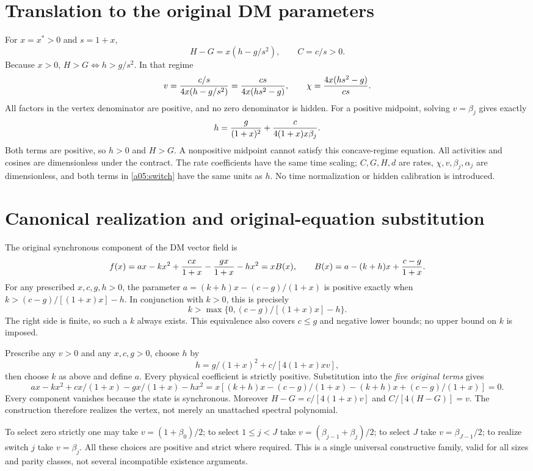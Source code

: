 \documentclass[11pt]{article}
\begin{document}
\section{Translation to the original DM parameters}
For $x=x^*>0$ and $s=1+x$,
\[
 H-G=x(h-g/s^2),\qquad C=c/s>0.
\]
Because $x>0$, $H>G\iff h>g/s^2$. In that regime
\[
 v={c/s\over4x(h-g/s^2)}={cs\over4x(hs^2-g)},\qquad
 \chi={4x(hs^2-g)\over cs}.
\]
All factors in the vertex denominator are positive, and no zero
denominator is hidden. For a positive midpoint, solving $v=\beta_j$
gives exactly
\begin{equation}
 h={g\over(1+x)^2}+{c\over4(1+x)x\beta_j}. \label{a05:switch}
\end{equation}
Both terms are positive, so $h>0$ and $H>G$. A nonpositive midpoint
cannot satisfy this concave-regime equation. All activities and cosines
are dimensionless under the contract. The rate coefficients have the
same time scaling; $C,G,H,d$ are rates, $\chi,v,\beta_j,\alpha_j$
are dimensionless, and both terms in \eqref{a05:switch} have the same
units as $h$. No time normalization or hidden calibration is introduced.

\section{Canonical realization and original-equation substitution}
The original synchronous component of the DM vector field is
\[
 f(x)=ax-kx^2+{cx\over1+x}-{gx\over1+x}-hx^2
 =xB(x),\qquad B(x)=a-(k+h)x+{c-g\over1+x}.
\]
For any prescribed $x,c,g,h>0$, the parameter
$a=(k+h)x-(c-g)/(1+x)$ is positive exactly when
$k>(c-g)/[(1+x)x]-h$. In conjunction with $k>0$, this is precisely
\[
 k>\max\{0,(c-g)/[(1+x)x]-h\}.
\]
The right side is finite, so such a $k$ always exists. This equivalence
also covers $c\le g$ and negative lower bounds; no upper bound on $k$
is imposed.

Prescribe any $v>0$ and any $x,c,g>0$, choose $h$ by
\[
 h=g/(1+x)^2+c/[4(1+x)xv],
\]
then choose $k$ as above and define $a$. Every physical coefficient is
strictly positive. Substitution into the \emph{five original terms}
gives
\[
 ax-kx^2+cx/(1+x)-gx/(1+x)-hx^2
 =x[(k+h)x-(c-g)/(1+x)-(k+h)x+(c-g)/(1+x)]=0.
\]
Every component vanishes because the state is synchronous. Moreover
$H-G=c/[4(1+x)v]$ and $C/[4(H-G)]=v$. The construction therefore
realizes the vertex, not merely an unattached spectral polynomial.

To select zero strictly one may take $v=(1+\beta_0)/2$; to select
$1\le j<J$ take $v=(\beta_{j-1}+\beta_j)/2$; to select $J$ take
$v=\beta_{J-1}/2$; to realize switch $j$ take $v=\beta_j$.
All these choices are positive and strict where required. This is a
single universal constructive family, valid for all sizes and parity
classes, not several incompatible existence arguments.
\end{document}
